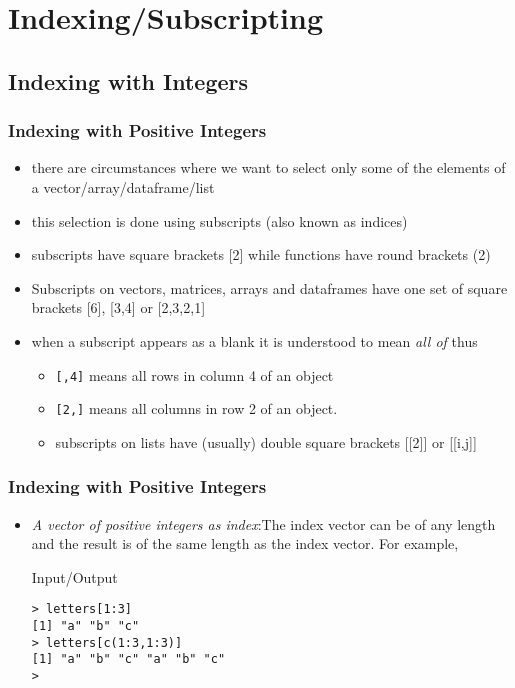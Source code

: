 \documentclass[xcolor={table},c]{beamer}
\begin{document}
\section{Indexing/Subscripting}
\subsection{Indexing with Integers}
\begin{frame}[fragile]\frametitle{Indexing with Positive Integers} %
\begin{itemize}
\item there are circumstances where we want to select only some of the elements of a vector/array/dataframe/list
\item this selection is done using subscripts (also known as indices)
\item subscripts have square brackets [2] while functions have round brackets (2)
\item Subscripts on vectors, matrices, arrays and dataframes have one set of square brackets [6], [3,4] or [2,3,2,1]
\item when a subscript appears as a blank it is understood to mean \emph{all of} thus
\begin{itemize}
\item \verb+[,4]+ means all rows in column 4 of an object
\item \verb+[2,]+ means all columns in row 2 of an object.
\item subscripts on lists have (usually) double square brackets [[2]] or [[i,j]]
\end{itemize}

\end{itemize}
\end{frame}

\begin{frame}\frametitle{Indexing with Positive Integers}
\begin{itemize}
\item \emph{A vector of positive integers as index}:The index vector can be of any length and the result is of the same length as the index vector. For example,
\begin{exampleblock}{Input/Output}
\begin{verbatim}
> letters[1:3]
[1] "a" "b" "c"
> letters[c(1:3,1:3)]
[1] "a" "b" "c" "a" "b" "c"
>
\end{verbatim}
\end{exampleblock}
\end{itemize}
\end{frame}
\end{document}
